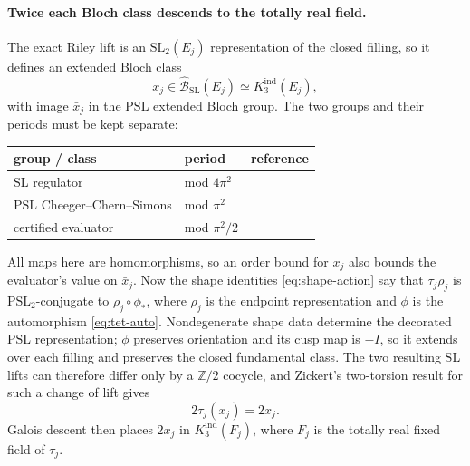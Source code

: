 \documentclass[11pt]{article}
\theoremstyle{definition}
\newcommand{\Z}{\mathbb{Z}}
\newcommand{\SL}{\mathrm{SL}}
\newcommand{\PSL}{\mathrm{PSL}}
\newcommand{\Kind}{K_3^{\mathrm{ind}}}
\begin{document}
\paragraph{Twice each Bloch class descends to the totally real field.}
The exact Riley lift is an $\SL_2(E_j)$ representation of the closed filling, so
it defines an extended Bloch class
\[
 x_j\in\widehat{\mathcal B}_{\SL}(E_j)\simeq\Kind(E_j),
\]
with image $\bar x_j$ in the $\PSL$ extended Bloch group.  The two groups and
their periods must be kept separate:
\begin{center}
\begin{tabular}{@{}lll@{}}
\toprule
 group / class & period & reference\\
\midrule
 $\SL$ regulator & mod $4\pi^2$ & \cite[Section~2.2.1]{ZickertK3}\\
 $\PSL$ Cheeger--Chern--Simons & mod $\pi^2$ & \cite[Prop.~2.5, Thm.~2.6]{Neumann}\\
 certified evaluator & mod $\pi^2/2$ & \cite[Thm.~3.4]{Yoon}\\
\bottomrule
\end{tabular}
\end{center}
All maps here are homomorphisms, so an order bound for $x_j$ also bounds the
evaluator's value on $\bar x_j$.  Now the shape identities \eqref{eq:shape-action}
say that $\tau_j\rho_j$ is $\PSL_2$-conjugate to $\rho_j\circ\phi_*$, where
$\rho_j$ is the endpoint representation and $\phi$ is the automorphism
\eqref{eq:tet-auto}.  Nondegenerate shape data determine the decorated $\PSL$
representation; $\phi$ preserves orientation and its cusp map is $-I$, so it
extends over each filling and preserves the closed fundamental class.  The two
resulting $\SL$ lifts can therefore differ only by a $\Z/2$ cocycle, and
Zickert's two-torsion result for such a change of lift gives
\cite[Theorem~6.15]{ZickertK3}
\[
 2\tau_j(x_j)=2x_j.
\]
Galois descent \cite[Corollaries~7.14--7.15]{ZickertK3} then places $2x_j$ in
$\Kind(F_j)$, where $F_j$ is the totally real fixed field of $\tau_j$.
\end{document}
